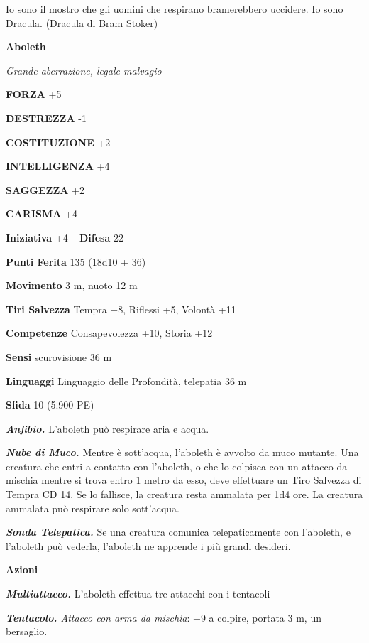 \begin{tcolorbox}[enhanced,arc=5pt,boxrule=0.3pt]{Io sono il mostro che gli uomini che respirano bramerebbero uccidere. Io sono Dracula. (Dracula di Bram Stoker)}\end{tcolorbox}\medskip

\bigskip

\begin{multicols}{2}

\medskip{}\textbf{Aboleth}

\emph{Grande aberrazione, legale malvagio}

\textbf{FORZA} +5

\textbf{DESTREZZA} -1

\textbf{COSTITUZIONE} +2

\textbf{INTELLIGENZA} +4

\textbf{SAGGEZZA} +2

\textbf{CARISMA} +4

\textbf{Iniziativa} +4 -- \textbf{Difesa} 22

\textbf{Punti Ferita} 135 (18d10 + 36)

\textbf{Movimento} 3 m, nuoto 12 m

\textbf{Tiri Salvezza} Tempra +8, Riflessi +5, Volontà +11

\textbf{Competenze} Consapevolezza +10, Storia +12

\textbf{Sensi} scurovisione 36 m

\textbf{Linguaggi} Linguaggio delle Profondità, telepatia 36 m

\textbf{Sfida} 10 (5.900 PE)

\emph{\textbf{Anfibio.}} L'aboleth può respirare aria e acqua.

\emph{\textbf{Nube di Muco.}} Mentre è sott'acqua, l'aboleth è avvolto da muco mutante. Una creatura che entri a contatto con l'aboleth, o che lo colpisca con un attacco da mischia mentre si trova entro 1 metro da esso, deve effettuare un Tiro Salvezza di Tempra CD 14. Se lo fallisce, la creatura resta ammalata per 1d4 ore. La creatura ammalata può respirare solo sott'acqua.

\emph{\textbf{Sonda Telepatica.}} Se una creatura comunica telepaticamente con l'aboleth, e l'aboleth può vederla, l'aboleth ne apprende i più grandi desideri.

\textbf{Azioni}

\emph{\textbf{Multiattacco.}} L'aboleth effettua tre attacchi con i tentacoli

\emph{\textbf{Tentacolo.} Attacco con arma da mischia}: +9 a colpire, portata 3 m, un bersaglio.


\end{multicols}
